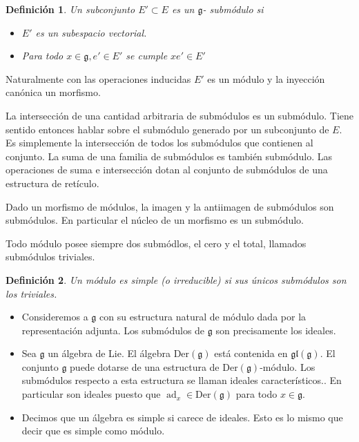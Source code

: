 \documentclass[a4paper,draft,12pt]{scrartcl}
\newtheorem{defi}{Definición}[section]%
\newcommand{\g}{\mathfrak{g}}%
\newcommand{\df}[1]{\textsf{\color{blue}#1}}
\DeclareMathOperator{\ad}{ad}  %
\begin{document}
\begin{defi}

Un subconjunto $E' \subset E$ es un $\g$- \df{submódulo}  si

\begin{itemize}

\item $E'$ es un subespacio vectorial.

\item Para todo $x \in \g, e' \in E'$ se cumple $xe'\in E'$

\end{itemize}

\end{defi}

Naturalmente con las operaciones inducidas $E'$ es un módulo y la inyección canónica un morfismo.

La intersección de una cantidad arbitraria de submódulos es  un submódulo.  Tiene sentido entonces hablar sobre el submódulo generado por un subconjunto de $E$.  Es simplemente la intersección de todos los submódulos que contienen al conjunto.  La suma de una familia de submódulos es también submódulo.  Las operaciones de suma e intersección dotan al conjunto de submódulos de una estructura de retículo.

Dado un morfismo de módulos, la imagen y la antiimagen de submódulos son submódulos.  En particular el núcleo de un morfismo es un submódulo.

Todo módulo posee siempre dos submódlos, el cero y el total, llamados submódulos triviales.

\begin{defi}

Un módulo es  \df{simple}  (o  \df{irreducible}) si sus únicos submódulos son los triviales.

\end{defi}

  

\begin{itemize}

\item Consideremos a $\g$ con su estructura natural de módulo dada por la representación adjunta. Los submódulos de $\g$ son precisamente los ideales.

\item Sea $\g$ un álgebra de Lie.  El álgebra $\mathrm{Der}(\g)$ está contenida en $\mathfrak{gl}(\g)$.  El conjunto $\g$ puede dotarse de una estructura de $\mathrm{Der}(\g)$-módulo.  Los submódulos respecto a esta estructura se llaman   \df{ideales característicos}..  En particular son ideales puesto que $\ad_x \in \mathrm{Der}(\g)$ para todo $x \in \g$.

\item  Decimos que un álgebra es simple si carece de ideales. Esto es lo mismo que decir que es simple como módulo.

\end{itemize}
\end{document}
